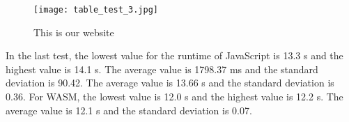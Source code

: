 \begin{figure}[H]
    \centering
    \caption[]{This is our website}
	\label{fig:tableTest3}
    \texttt{[image: table\_test\_3.jpg]}
\end{figure}
In the last test, the lowest value for the runtime of JavaScript is 13.3 s and the highest value is 14.1 s. The average value is 1798.37 ms and the standard deviation is 90.42. The average value is 13.66 s and the standard deviation is 0.36. For WASM, the lowest value is 12.0 s and the highest value is 12.2 s. The average value is 12.1 s and the standard deviation is 0.07.